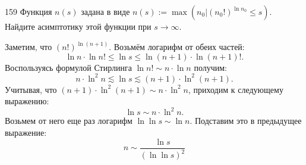 \begin{task}{159}
    Функция $n(s)$ задана в виде $n(s) := \max(n_0 | (n_0!)^{\ln n_0} \leq s)$. Найдите асимптотику этой функции при $s \rightarrow \infty$. 
\end{task}

\begin{solution} 
	Заметим, что $(n!)^{\ln(n+1)}.$ Возьмём логарифм от обеих частей:
	\[ \ln n \cdot \ln n! \leq \ln s \leq \ln (n+1) \cdot \ln (n+1)!.\]
	Воспользуясь формулой Стирлинга $\ln n! \sim n \cdot \ln n$ получим:
	\[ n \cdot \ln^2n \lesssim \ln s \lesssim (n+1) \cdot \ln^2(n+1).\]
	Учитывая, что $ (n+1) \cdot \ln^2(n+1) \sim n \cdot \ln^2n$, приходим к следующему выражению:
	\[ \ln s \sim n \cdot \ln^2 n.\]
	Возьмем от него еще раз логарифм $ \ln \ln s \sim \ln n$. Подставим это в предыдущее выражение: 
	\[n \sim \dfrac{\ln s}{(\ln \ln s)^2}\]
\end{solution}